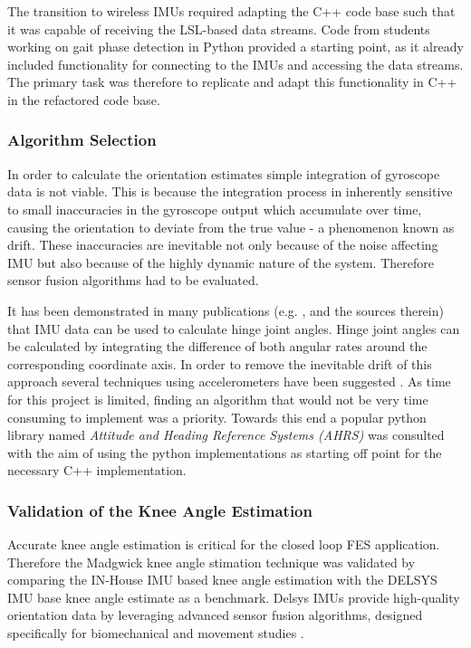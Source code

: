 The transition to wireless IMUs required adapting the C++ code base such that it was capable of receiving the LSL-based data streams. Code from students working on gait phase detection in Python provided a starting point, as it already included functionality for connecting to the IMUs and accessing the data streams. The primary task was therefore to replicate and adapt this functionality in C++ in the refactored code base.

\subsubsection{Algorithm Selection}
In order to calculate the orientation estimates simple integration of gyroscope data is not viable. This is because the integration process in inherently sensitive to small inaccuracies in the gyroscope output which accumulate over time, causing the orientation to deviate from the true value - a phenomenon known as drift. These inaccuracies are inevitable not only because of the noise affecting IMU but also because of the highly dynamic nature of the system. Therefore sensor fusion algorithms had to be evaluated.

It has been demonstrated in many publications (e.g. \cite{peng_cheng_joint-angle_2010}, \cite{sabatini_estimating_2011} and the sources therein) that IMU data can be used to calculate hinge joint angles. Hinge joint angles can be calculated by integrating the difference of both angular rates around the corresponding coordinate axis. In order to remove the inevitable drift of this approach several techniques using accelerometers have been suggested \cite{peng_cheng_joint-angle_2010}. As time for this project is limited, finding an algorithm that would not be very time consuming to implement was a priority. Towards this end a popular python library named \textit{Attitude and Heading Reference Systems (AHRS)} \cite{noauthor_ahrs_nodate} was consulted with the aim of using the python implementations as starting off point for the necessary C++ implementation. 

\subsubsection{Validation of the Knee Angle Estimation}
Accurate knee angle estimation is critical for the closed loop FES application. Therefore the Madgwick knee angle stimation technique was validated by comparing the IN-House IMU based knee angle estimation with the DELSYS IMU base knee angle estimate as a benchmark. Delsys IMUs provide high-quality orientation data by leveraging advanced sensor fusion algorithms, designed specifically for biomechanical and movement studies . 

